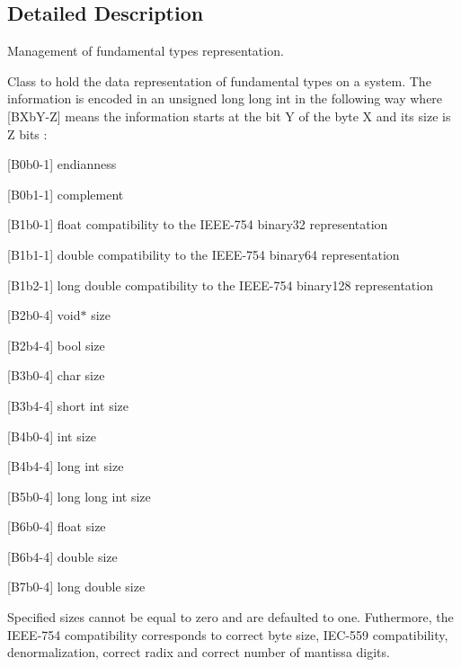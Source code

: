 \subsection{Detailed Description}
Management of fundamental types representation. 

Class to hold the data representation of fundamental types on a system. The information is encoded in an {\ttfamily unsigned long long int} in the following way where {\ttfamily \mbox{[}B\-Xb\-Y-\/\-Z\mbox{]} } means the information starts at the bit {\ttfamily Y} of the byte {\ttfamily X} and its size is {\ttfamily Z} bits \-: 
\begin{DoxyItemize}
\item {\ttfamily \mbox{[}B0b0-\/1\mbox{]}} endianness 
\item {\ttfamily \mbox{[}B0b1-\/1\mbox{]}} complement 
\item {\ttfamily \mbox{[}B1b0-\/1\mbox{]}} {\ttfamily float} compatibility to the I\-E\-E\-E-\/754 {\ttfamily binary32} representation 
\item {\ttfamily \mbox{[}B1b1-\/1\mbox{]}} {\ttfamily double} compatibility to the I\-E\-E\-E-\/754 {\ttfamily binary64} representation 
\item {\ttfamily \mbox{[}B1b2-\/1\mbox{]}} {\ttfamily long double} compatibility to the I\-E\-E\-E-\/754 {\ttfamily binary128} representation 
\item {\ttfamily \mbox{[}B2b0-\/4\mbox{]}} {\ttfamily void$\ast$} size 
\item {\ttfamily \mbox{[}B2b4-\/4\mbox{]}} {\ttfamily bool} size 
\item {\ttfamily \mbox{[}B3b0-\/4\mbox{]}} {\ttfamily char} size 
\item {\ttfamily \mbox{[}B3b4-\/4\mbox{]}} {\ttfamily short int} size 
\item {\ttfamily \mbox{[}B4b0-\/4\mbox{]}} {\ttfamily int} size 
\item {\ttfamily \mbox{[}B4b4-\/4\mbox{]}} {\ttfamily long int} size 
\item {\ttfamily \mbox{[}B5b0-\/4\mbox{]}} {\ttfamily long long int} size 
\item {\ttfamily \mbox{[}B6b0-\/4\mbox{]}} {\ttfamily float} size 
\item {\ttfamily \mbox{[}B6b4-\/4\mbox{]}} {\ttfamily double} size 
\item {\ttfamily \mbox{[}B7b0-\/4\mbox{]}} {\ttfamily long double} size
\end{DoxyItemize}Specified sizes cannot be equal to zero and are defaulted to one. Futhermore, the I\-E\-E\-E-\/754 compatibility corresponds to correct byte size, I\-E\-C-\/559 compatibility, denormalization, correct radix and correct number of mantissa digits. 

